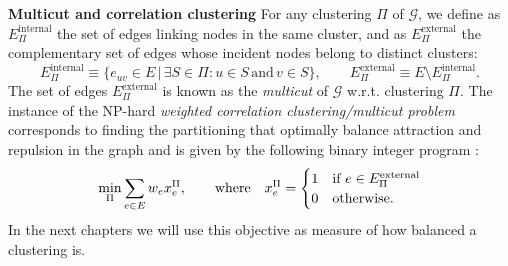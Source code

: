 \textbf{Multicut and correlation clustering } For any clustering $\Pi$ of $\mathcal{G}$, we define as $E^{\mathrm{internal}}_\Pi$ the set of edges linking nodes in the same cluster, and as $E_\Pi^{\mathrm{external}}$ the complementary set of edges whose incident nodes belong to distinct clusters:
\begin{equation}
E_\Pi^{\mathrm{internal}} \equiv \{ e_{uv} \in E \,|\, \exists S \in \Pi : u \in S \, \text{and} \, v \in S \}, \qquad E^{\mathrm{external}}_\Pi \equiv E \setminus E^{\mathrm{internal}}_\Pi.
\end{equation}
The set of edges $E_\Pi^{\mathrm{external}}$ is known as the \emph{multicut} of $\mathcal{G}$ w.r.t. clustering $\Pi$. The instance of the NP-hard \emph{weighted correlation clustering/multicut problem} 
corresponds to finding the partitioning that optimally balance attraction and repulsion in the graph and is given by the following binary integer program \cite{kappes2011globally,chopra1991multiway,andres2015lifting}:
\begin{equation}\label{eq:multicut_obj}
 \min_\Pi \sum_{e\in E} w_e x_e^\Pi,  \qquad \text{where} \quad x^\Pi_e = 
 \begin{cases} 
 1 & \text{if } e\in E^{\mathrm{external}}_\Pi \\
 0 & \text{otherwise}.
 \end{cases}
\end{equation}
In the next chapters we will use this objective as measure of how balanced a clustering is.

